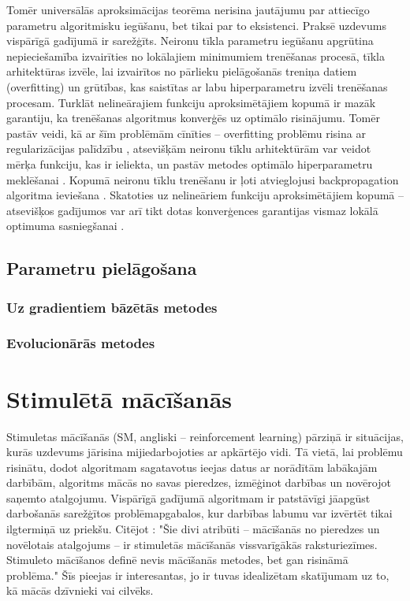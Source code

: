 \documentclass{ludis} %
\begin{document}
Tomēr universālās aproksimācijas teorēma nerisina jautājumu par attiecīgo parametru algoritmisku iegūšanu, bet tikai par to eksistenci.
Praksē uzdevums vispārīgā gadījumā ir sarežģīts.
Neironu tīkla parametru iegūšanu apgrūtina nepieciešamība izvairīties no lokālajiem minimumiem trenēšanas procesā, tīkla arhitektūras izvēle, lai izvairītos no pārlieku pielāgošanās treniņa datiem (overfitting) un grūtības, kas saistītas ar labu hiperparametru izvēli trenēšanas procesam.
Turklāt nelineārajiem funkciju aproksimētājiem kopumā ir mazāk garantiju, ka trenēšanas algoritmus konverģēs uz optimālo risinājumu.
Tomēr pastāv veidi, kā ar šīm problēmām cīnīties -- overfitting problēmu risina ar regularizācijas palīdzību \autocite{sarle1995stopped} \autocite{srivastava2014dropout}, atsevišķām neironu tīklu arhitektūrām var veidot mērķa funkciju, kas ir ieliekta, un pastāv metodes optimālo hiperparametru meklēšanai \autocite{bergstra2011algorithms}.
Kopumā neironu tīklu trenēšanu ir ļoti atvieglojusi backpropagation algoritma ieviešana \autocite{Werbos74} \autocite{Rumelhart1988}.
Skatoties uz nelineāriem funkciju aproksimētājiem kopumā -- atsevišķos gadījumos var arī tikt dotas konverģences garantijas vismaz lokālā optimuma sasniegšanai \autocite{bhatnagar2009convergent}.

\section{Parametru pielāgošana}
\subsection{Uz gradientiem bāzētās metodes}
\subsection{Evolucionārās metodes}

\chapter{Stimulētā mācīšanās} \label{chap:stim}
Stimuletas mācīšanās (SM, angliski -- reinforcement learning) pārziņā ir situācijas, kurās uzdevums jārisina mijiedarbojoties ar apkārtējo vidi. 
Tā vietā, lai problēmu risinātu, dodot algoritmam sagatavotus ieejas datus ar norādītām labākajām darbībām, algoritms mācās no savas pieredzes, izmēģinot darbības un novērojot saņemto atalgojumu.
Vispārīgā gadījumā algoritmam ir patstāvīgi jāapgūst darbošanās sarežģītos problēmapgabalos, kur darbības labumu var izvērtēt tikai ilgtermiņā uz priekšu.
Citējot \citet{Barto}: "Šie divi atribūti -- mācīšanās no pieredzes un novēlotais atalgojums -- ir stimuletās mācīšanās vissvarīgākās raksturiezīmes.
Stimuleto mācīšanos definē nevis mācīšanās metodes, bet gan risināmā problēma."
Šīs pieejas ir interesantas, jo ir tuvas idealizētam skatījumam uz to, kā mācās dzīvnieki vai cilvēks.
\end{document}
